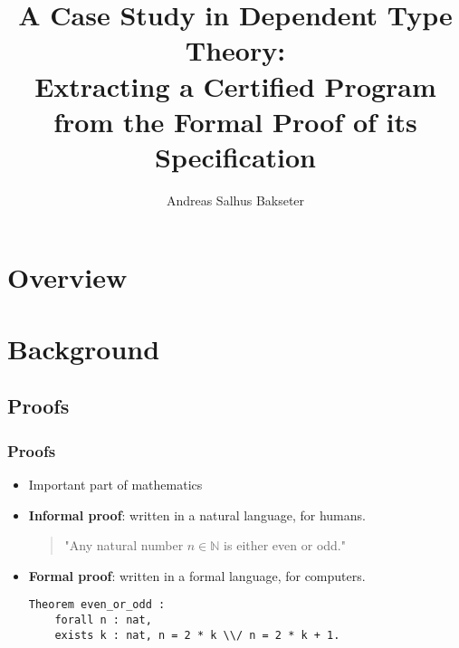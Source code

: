 \documentclass[slides]{beamer}
\title{A Case Study in Dependent Type Theory:\\ Extracting a Certified Program from the Formal Proof of its Specification}
\author{Andreas Salhus Bakseter}
\institute{Department of Informatics\\University of Bergen}
\begin{document}
\frame{\titlepage}

\section{Overview}


\section{Background}
\subsection{Proofs}

\begin{frame}[fragile]
    \frametitle{Proofs}

    \begin{itemize}
        \item Important part of mathematics
        \item
            \textbf{Informal proof}: written in a natural language, for humans.

            \begin{quote}
              "Any natural number $n \in \mathbb{N}$ is either even or odd."
            \end{quote}

        \item \textbf{Formal proof}: written in a formal language, for computers.
            \begin{lstlisting}
Theorem even_or_odd :
    forall n : nat,
    exists k : nat, n = 2 * k \\/ n = 2 * k + 1.
            \end{lstlisting}
    \end{itemize}
\end{frame}
\end{document}
